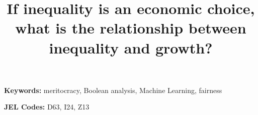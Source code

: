\documentclass[english,11pt,a4paper]{article}
\theoremstyle{definition}
\begin{document}
\title{If inequality is an economic choice, what is the relationship between inequality and growth?}
\author{}
\date{}
\maketitle

\begin{abstract}
	\noindent
	
\end{abstract}

\vspace{1em}
\noindent\textbf{Keywords:} meritocracy, Boolean analysis, Machine Learning, fairness

\vspace{0.5em}
\noindent\textbf{JEL Codes:} D63, I24, Z13
	

\end{document}
